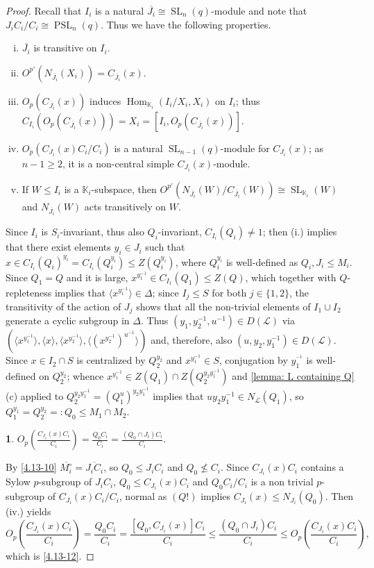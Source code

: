 \documentclass{amsart}
\numberwithin{equation}{section}
\theoremstyle{definition}
\theoremstyle{subresult}
\newtheorem{subresult}{}[equation]
\theoremstyle{caseresult}
\newcommand{\bK}{\mathbb{K}}
\renewcommand{\L}{\mathcal{L}}
\newcommand{\Hom}{\operatorname{Hom}}
\newcommand{\SL}{\operatorname{SL}}
\newcommand{\PSL}{\operatorname{PSL}}
\newcommand{\ov}{\overline}
\newcommand{\inv}{^{-1}}
\newcommand{\<}{\langle}
\renewcommand{\>}{\rangle}
\begin{document}
\begin{proof}
	Recall that $I_i$ is a natural $\ov{J_i} \cong \SL_n(q)$-module and note that $J_iC_i/C_i \cong \PSL_n(q)$. Thus we have the following properties.
	\begin{enumerate}[i.]
		\item $\ov{J_i}$ is transitive on $I_i$.
		\item $O^{p'}(N_{\ov {J_i}}(X_i)) = C_{\ov{J_i}}(x)$.
		\item $O_p(C_{\ov{J_i}}(x))$ induces $\Hom_{\bK_i}(I_i/X_i,X_i)$ on $I_i$; thus $C_{I_i}(O_p(C_{\ov{J_i}}(x))) = X_i = [I_i, O_p(C_{\ov{J_i}}(x))]$.
		\item $O_p(C_{J_i}(x) C_i / C_i)$ is a natural $\SL_{n-1}(q)$-module for $C_{J_i}(x)$; as $n-1 \ge 2$, it is a non-central simple $C_{J_i}(x)$-module.
		\item If $W \le I_i$ is a $\bK_i$-subspace, then $O^{p'}(N_{\ov{J_i}}(W) / C_{\ov{J_i}}(W)) \cong \SL_{\bK_i}(W)$ and $N_{\ov{J_i}}(W)$ acts transitively on $W$.
	\end{enumerate}
	Since $I_i$ is $S_i$-invariant, thus also $Q_i$-invariant, $C_{I_i}(Q_i) \ne 1$; then (i.) implies that there exist elements $y_i \in J_i$ such that $x \in C_{I_i}(Q_i)^{y_i} = C_{I_i}(Q_i^{y_i}) \le Z(Q_i^{y_i})$, where $Q_i^{y_i}$ is well-defined as $Q_i, J_i \le M_i$. Since $Q_1=Q$ and it is large, $x^{y_1\inv} \in C_{I_1}(Q_1) \le Z(Q)$, which together with $Q$-repleteness implies that $\< x^{y_1\inv} \> \in \Delta$; since $I_j \le S$ for both $j \in \{1,2\}$, the transitivity of the action of $J_j$ shows that all the non-trivial elements of $I_1 \cup I_2$ generate a cyclic subgroup in $\Delta$. Thus $(y_1,y_2\inv,u\inv) \in D(\L)$ via $(\< x ^{y_1\inv}\>, \< x \>, \< x^{y_2\inv} \>, \< (x^{y_2\inv} )^{u\inv} \> ) $ and, therefore, also $(u,y_2, y_1\inv) \in D(\L)$. Since $x \in I_2 \cap S$ is centralized by $Q_2^{y_2}$ and $x^{y_1\inv} \in S$, conjugation by $y_1^{\inv}$ is well-defined on $Q_2^{y_2}$; whence $x^{y_1\inv} \in Z(Q_1) \cap Z(Q_2^{y_2 y_1\inv})$ and \ref{lemma: L containing Q}(c) applied to $Q_2^{y_2y_1\inv}= (Q_1^u)^{y_2y_1\inv}$ implies that $uy_2y_1\inv \in N_\L(Q_1)$, so $Q_1^{y_1} = Q_2^{y_2} =: Q_0 \le M_1 \cap M_2$.
	
	\begin{subresult}\label{4.13-12}
		$\displaystyle O_p \left( \frac{C_{J_i}(x)C_i}{C_i} \right) = \frac{Q_0C_i}{C_i} = \frac{(Q_0 \cap J_i)C_i}{C_i}.$
	\end{subresult}
	By \eqref{4.13-10} $\ov{M_i^\circ} = \ov{J_iC_i}$, so $Q_0 \le J_iC_i$ and $Q_0 \not \le C_i$. Since $C_{J_i}(x) C_i$ contains a Sylow $p$-subgroup of $J_iC_i$, $Q_0 \le C_{J_i}(x)C_i$ and $Q_0C_i / C_i$ is a non trivial $p$-subgroup of $C_{J_i}(x)C_i/C_i$, normal as $(Q!)$ implies $C_{J_i}(x) \le N_{J_i}(Q_0)$. Then (iv.) yields
	\[
	O_p \left( \frac{C_{J_i}(x)C_i}{C_i} \right) = \frac{Q_0C_i}{C_i} = \frac{[Q_0,C_{J_i}(x)]C_i}{C_i} \le\frac{(Q_0 \cap J_i)C_i}{C_i} \le O_p \left( \frac{C_{J_i}(x)C_i}{C_i} \right),
	\]
	which is \eqref{4.13-12}.
	

\end{proof}
\end{document}
